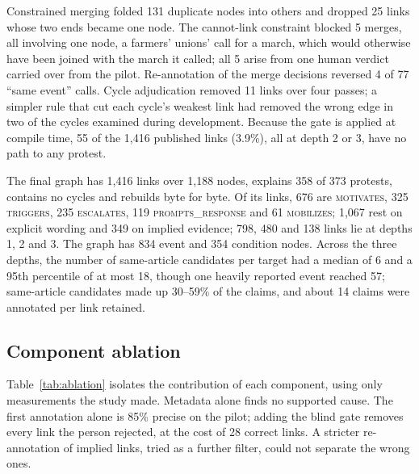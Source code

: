 \documentclass[pdflatex,sn-basic,lineno]{sn-jnl}
\theoremstyle{thmstylethree}
\theoremstyle{thmstyleone}
\newcommand{\rel}[1]{\textsc{#1}}
\begin{document}
Constrained merging folded 131 duplicate nodes into others and dropped 25 links whose two ends
became one node. The cannot-link constraint blocked 5 merges, all involving one node, a farmers'
unions' call for a march, which would otherwise have been joined with the march it called; all 5
arise from one human verdict carried over from the pilot. Re-annotation of the merge decisions
reversed 4 of 77 ``same event'' calls. Cycle adjudication removed 11 links over four passes; a
simpler rule that cut each cycle's weakest link had removed the wrong edge in two of the cycles
examined during development. Because the gate is applied at
compile time, 55 of the 1{,}416 published links (3.9\%), all at depth 2 or 3, have no path to any
protest.

The final graph has 1{,}416 links over 1{,}188 nodes, explains 358 of 373 protests, contains no
cycles and rebuilds byte for byte. Of its links, 676 are \rel{motivates}, 325 \rel{triggers}, 235
\rel{escalates}, 119 \rel{prompts\_response} and 61 \rel{mobilizes}; 1{,}067 rest on explicit
wording and 349 on implied evidence; 798, 480 and 138 links lie at depths 1, 2 and 3. The graph has
834 event and 354 condition nodes. Across the three depths, the number of same-article candidates
per target had a median of 6 and a 95th percentile of at most 18, though one heavily reported event
reached 57; same-article candidates made up 30--59\% of the claims, and about 14 claims were
annotated per link retained.

\subsection{Component ablation}
Table~\ref{tab:ablation} isolates the contribution of each component, using only measurements the
study made. Metadata alone finds no supported cause. The first annotation alone is 85\% precise on
the pilot; adding the blind gate removes every link the person rejected, at the cost of 28 correct
links. A stricter re-annotation of implied links, tried as a further filter, could not separate the
wrong ones.
\end{document}
